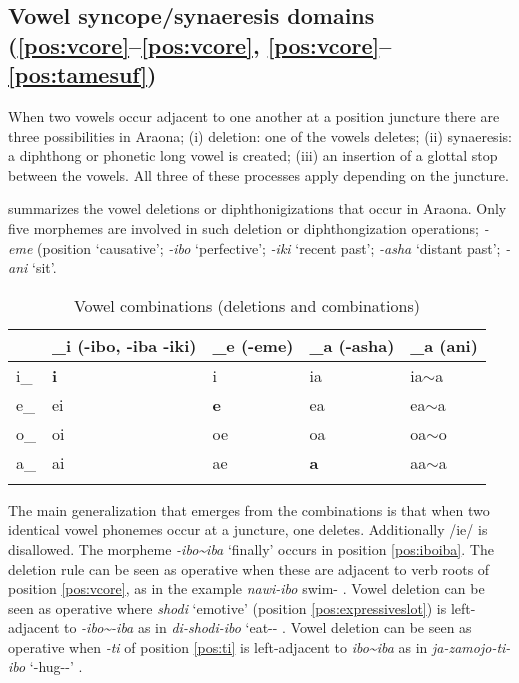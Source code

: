 \documentclass[output=paper,hidelinks]{langscibook}
\begin{document}
\largerpage
\subsection{Vowel syncope/synaeresis domains  (\ref{pos:vcore}--\ref{pos:vcore}, \ref{pos:vcore}--\ref{pos:tamesuf})}
\label{sec:vowel}

When two vowels occur adjacent to one another at a position juncture there are three possibilities in Araona; (i) deletion: one of the vowels deletes; (ii) synaeresis: a diphthong or phonetic long vowel is created; (iii) an insertion of a glottal stop between the vowels. All three of these processes apply depending on the juncture. 

 summarizes the vowel deletions or diphthonigizations that occur in Araona. Only five morphemes are involved in such deletion or diphthongization operations; \textit{-eme} (position `causative'; \textit{-ibo} `perfective'; \textit{-iki} `recent past'; \textit{-asha} `distant past'; \textit{-ani} `sit'.

\begin{table}
\caption{Vowel combinations (deletions and combinations)}
\label{tab:voweldeletions}
\begin{tabular}{lllll}
\lsptoprule
    & \_i (-ibo, -iba -iki) & \_e (-eme) & \_a (-asha) & \_a (ani) \\ \midrule
i\_ & \textbf{i}   & i   & ia          & ia$\sim$a \\
e\_ & ei  & \textbf{e}   & ea          & ea$\sim$a \\
o\_ & oi  & oe  & oa          & oa$\sim$o \\
a\_ & ai  & ae  & \textbf{a}          & aa$\sim$a \\
\lspbottomrule
\end{tabular}
\end{table}

The main generalization that emerges from the combinations is that when two identical vowel phonemes occur at a juncture, one deletes. Additionally /ie/ is disallowed. The morpheme \textit{-ibo\textasciitilde iba} `finally' occurs in position \ref{pos:iboiba}. The deletion rule can be seen as operative when these are adjacent to verb roots of position \ref{pos:vcore}, as in the example \textit{nawi-ibo} swim-\Final{} . Vowel deletion can be seen as operative where \textit{shodi} `emotive' (position \ref{pos:expressiveslot}) is left-adjacent to \textit{-ibo\textasciitilde-iba} as in \textit{di-shodi-ibo} `eat-\Emot{}-\Final{} . Vowel deletion can be seen as operative when \textit{-ti} of position \ref{pos:ti} is left-adjacent to \textit{ibo\textasciitilde iba} as in \textit{ja-zamojo-ti-ibo} `\Intrc{}-hug-\Intrc{}-\Final{}' .
\end{document}

